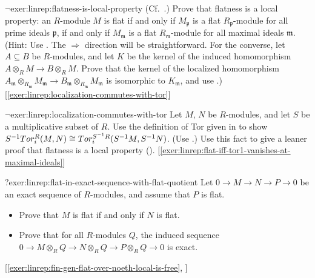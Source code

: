 \begin{exer}{$\lnot$}{exer:linrep:flatness-is-local-property}
  (Cf.\ .) Prove that
  flatness is a local property: an $R$-module $M$ is flat if and only
  if $M_{\mathfrak{p}}$ is a flat $R_{\mathfrak{p}}$-module for all
  prime ideals $\mathfrak{p}$, if and only if $M_{\mathfrak{m}}$ is a
  flat $R_{\mathfrak{m}}$-module for all maximal ideals
  $\mathfrak{m}$. (Hint: Use
  .
  The
  $\Rightarrow$ direction will be straightforward. For the converse,
  let $A \subseteq B$ be $R$-modules, and let $K$ be the kernel of the
  induced homomorphism $A \otimes_R M \to B \otimes_R M$. Prove that
  the kernel of the localized homomorphism
  $A_{\mathfrak{m}} \otimes_{R_{\mathfrak{m}}} M_{\mathfrak{m}} \to
  B_{\mathfrak{m}} \otimes_{R_{\mathfrak{m}}} M_{\mathfrak{m}}$ is
  isomorphic to $K_{\mathfrak{m}}$, and use
  .)
  [\ref{exer:linrep:localization-commutes-with-tor}]
\end{exer}
\begin{exer}{$\lnot$}{exer:linrep:localization-commutes-with-tor}
  Let $M$, $N$ be $R$-modules, and let $S$ be a multiplicative subset
  of $R$. Use the definition of Tor given in
   to show
  $S^{-1}Tor^R_i(M, N) \cong Tor^{S^{-1}R}_i(S^{-1}M,
  S^{-1}N)$. (Use
  .)  Use
  this fact to give a leaner proof that flatness is a local property
  (). [\ref{exer:linrep:flat-iff-tor1-vanishes-at-maximal-ideals}]
\end{exer}
\begin{exer}{$?$}{exer:linrep:flat-in-exact-sequence-with-flat-quotient}
  Let $0 \to M \to N \to P \to 0$ be an exact sequence of $R$-modules,
  and assume that $P$ is flat.
  \begin{itemize}
  \item Prove that $M$ is flat if and only if $N$ is flat.
  \item Prove that for all $R$-modules $Q$, the induced sequence
    $0 \to M \otimes_R Q \to N \otimes_R Q \to P \otimes_R Q \to 0$ is
    exact.
  \end{itemize}
  [\ref{exer:linrep:fin-gen-flat-over-noeth-local-is-free},
  ]
\end{exer}
